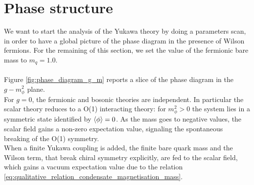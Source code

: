 \section{Phase structure}
We want to start the analysis of the Yukawa theory by doing a parameters scan, in order to have a global picture of the phase diagram in the presence of Wilson fermions. For the remaining of this section, we set the value of the fermionic bare mass to $m_q = 1.0$.\\~\\
Figure \ref{fig:phase_diagram_g_m} reports a slice of the phase diagram in the $g-m_\phi^2$ plane. \\
For $g=0$, the fermionic and bosonic theories are independent. In particular the scalar theory reduces to a O(1) interacting theory: for $m_\phi^2>0$ the system lies in a symmetric state identified by $\left\langle \phi \right\rangle = 0$. 
As the mass goes to negative values, the scalar field gains a non-zero expectation value, signaling the spontaneous breaking of the O(1) symmetry. \\
When a finite Yukawa coupling is added, the finite bare quark mass and the Wilson term, that break chiral symmetry explicitly, are fed to the scalar field, which gains a vacuum expectation value due to the relation \eqref{eq:qualitative_relation_condensate_magnetisation_mass}.
